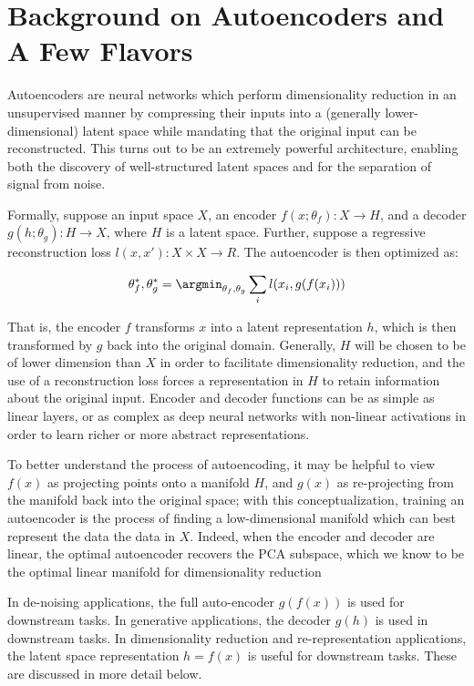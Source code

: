 
\section{Background on Autoencoders and A Few Flavors}

Autoencoders are neural networks which perform dimensionality
reduction in an unsupervised manner by compressing their inputs into
a (generally lower-dimensional) latent space while mandating that the
original input can be reconstructed. This turns out to be an
extremely powerful architecture, enabling both the discovery of
well-structured latent spaces and for the separation of signal from
noise.

Formally, suppose an input space $X$, an encoder $f(x ; \theta_f): X
\to H$, and a decoder $g(h ; \theta_g): H \to X$, where $H$ is a
latent space. Further, suppose a regressive reconstruction loss $l(x,
x'): X \times X \to R$. The autoencoder is then optimized as:

\begin{align*}
    \theta_f^*, \theta_g^* = \argmin_{\theta_f, \theta_g} \sum_i l(x_i, g(f(x_i)))
\end{align*}

That is, the encoder $f$ transforms $x$ into a latent representation
$h$, which is then transformed by $g$ back into the original domain.
Generally, $H$ will be chosen to be of lower dimension than $X$ in
order to facilitate dimensionality reduction, and the use of a
reconstruction loss forces a representation in $H$ to retain
information about the original input. Encoder and decoder functions
can be as simple as linear layers, or as complex as deep neural
networks with non-linear activations in order to learn richer or more
abstract representations.

To better understand the process of autoencoding, it may be helpful
to view $f(x)$ as projecting points onto a manifold $H$, and $g(x)$
as re-projecting from the manifold back into the original space; with
this conceptualization, training an autoencoder is the process of
finding a low-dimensional manifold which can best represent the data
the data in $X$. Indeed, when the encoder and decoder are linear, the
optimal autoencoder recovers the PCA subspace, which we know to be
the optimal linear manifold for dimensionality reduction \cite{alain2014regularized}


In de-noising applications, the full auto-encoder $g(f(x))$ is used
for downstream tasks. In generative applications, the decoder $g(h)$
is used in downstream tasks. In dimensionality reduction and
re-representation applications, the latent space representation
$h=f(x)$ is useful for downstream tasks. These are discussed in more
detail below.



